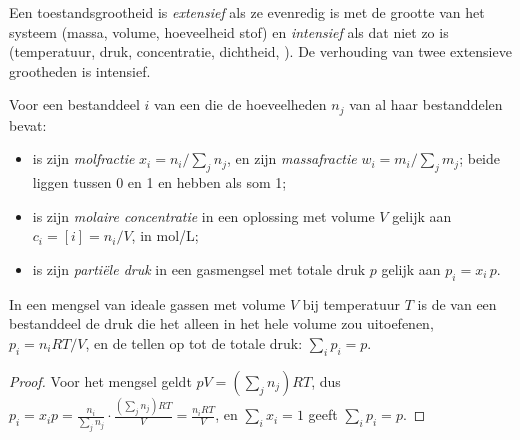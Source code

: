 \begin{definition}\label{def:b1:extent-q-and-k:variables}
Een toestandsgrootheid is \emph{extensief}
als ze evenredig is met de grootte van het systeem (massa, volume,
hoeveelheid stof) en \emph{intensief} als dat
niet zo is (temperatuur, druk, concentratie, dichtheid, ). De
verhouding van twee extensieve grootheden is intensief.
\end{definition}

\begin{definition}[Samenstellingsgrootheden]\label{def:b1:extent-q-and-k:composition}
Voor een bestanddeel $i$ van een  die de hoeveelheden $n_j$ van al
haar bestanddelen bevat:
\begin{itemize}
  \item is zijn \emph{molfractie} $x_i = n_i/\sum_j
        n_j$, en zijn \emph{massafractie} $w_i =
        m_i/\sum_j m_j$; beide liggen tussen 0 en 1 en hebben als som 1;
  \item is zijn \emph{molaire
        concentratie} in een oplossing met
        volume $V$ gelijk aan $c_i = [i] = n_i/V$,
        in \unit{mol/L};
  \item is zijn \emph{partiële
        druk} in een gasmengsel met
        totale druk $p$ gelijk aan $p_i = x_i\,p$.
\end{itemize}
\end{definition}

\begin{proposition}\label{prop:b1:extent-q-and-k:dalton}
In een mengsel van ideale gassen met volume $V$ bij temperatuur $T$ is de
 van een bestanddeel de druk die het alleen in het hele
volume zou uitoefenen, $p_i = n_iRT/V$, en de  tellen op
tot de totale druk: $\sum_i p_i = p$.
\end{proposition}

\begin{proof}
Voor het mengsel geldt $pV = (\sum_j n_j)RT$, dus $p_i = x_i p = \frac{n_i}{\sum_j
n_j}\cdot\frac{(\sum_j n_j)RT}{V} = \frac{n_iRT}{V}$, en $\sum_i x_i = 1$
geeft $\sum_i p_i = p$.
\end{proof}

